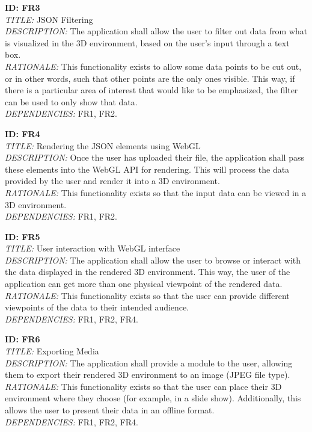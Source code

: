 \documentclass[journal,10pt,onecolumn,compsoc]{IEEEtran} \usepackage[margin=1.0in]{geometry} \usepackage{pdfpages}
\begin{document}
        \noindent \textbf{ID: FR3}\\
        \textit{TITLE:} JSON Filtering\\
        \textit{DESCRIPTION:} The application shall allow the user to filter out data from what is visualized in the 3D environment, based on the user's input through a text box. \\
        \textit{RATIONALE:} This functionality exists to allow some data points to be cut out, or in other words, such that other points are the only ones visible. This way, if there is a particular area of interest that would like to be emphasized, the filter can be used to only show that data. \\
        \textit{DEPENDENCIES:} FR1, FR2.
        \newline
        
        \noindent \textbf{ID: FR4}\\
        \textit{TITLE:} Rendering the JSON elements using WebGL\\
        \textit{DESCRIPTION:} Once the user has uploaded their file, the application shall pass these elements into the WebGL API for rendering. This will process the data provided by the user and render it into a 3D environment. \\
        \textit{RATIONALE:} This functionality exists so that the input data can be viewed in a 3D environment. \\
        \textit{DEPENDENCIES:} FR1, FR2. 

        \noindent \textbf{ID: FR5}\\
        \textit{TITLE:} User interaction with WebGL interface\\
        \textit{DESCRIPTION:} The application shall allow the user to browse or interact with the data displayed in the rendered 3D environment. This way, the user of the application can get more than one physical viewpoint of the rendered data.\\
        \textit{RATIONALE:} This functionality exists so that the user can provide different viewpoints of the data to their intended audience.\\
        \textit{DEPENDENCIES:} FR1, FR2, FR4. 
        \newline
        
        \noindent \textbf{ID: FR6}\\
        \textit{TITLE:} Exporting Media\\
        \textit{DESCRIPTION:} The application shall provide a module to the user, allowing them to export their rendered 3D environment to an image (JPEG file type).\\
        \textit{RATIONALE:} This functionality exists so that the user can place their 3D environment where they choose (for example, in a slide show). Additionally, this allows the user to present their data in an offline format.\\
        \textit{DEPENDENCIES:} FR1, FR2, FR4. 
\end{document}
